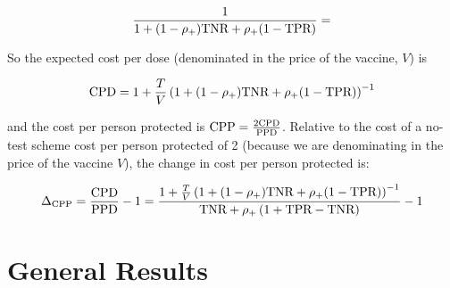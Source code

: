 \documentclass{article}
\begin{document}
$$
\frac{1}{1+(1-\rho_{{+}})\textrm{TNR} + \rho_{{+}}(1-\textrm{TPR})} = 
$$

So the expected cost per dose (denominated in the price of the vaccine, $V$) is

$$
\textrm{CPD} = 1 + \frac{T}{V}\left(1+(1-\rho_{{+}})\textrm{TNR} + \rho_{{+}}(1-\textrm{TPR})\right)^{-1}
$$

and the cost per person protected is $\textrm{CPP} = \frac{2\textrm{CPD}}{\textrm{PPD}}$. Relative to the cost of a no-test scheme cost per person protected of 2 (\nb* because we are denominating in the price of the vaccine $V$), the change in cost per person protected is:

$$
\Delta_{\textrm{CPP}} = \frac{\textrm{CPD}}{\textrm{PPD}}-1 =\frac{1 + \frac{T}{V}\left(1+(1-\rho_{{+}})\textrm{TNR} + \rho_{{+}}(1-\textrm{TPR})\right)^{-1}}{\textrm{TNR} + \rho_{{+}} \left(1 + \textrm{TPR}-\textrm{TNR}\right)} - 1
$$

\section{General Results}



%
\end{document}
